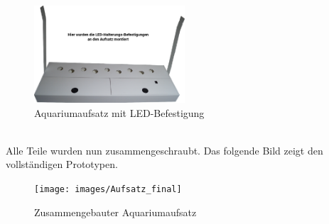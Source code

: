 \begin{description}
    \begin{figure}[ht]
        \centering
        \includegraphics[width=0.5\textwidth]{images/Aufsatz_komplett_LED}
	    \caption{Aquariumaufsatz mit LED-Befestigung}
    \end{figure}\mbox{} \\
    Alle Teile wurden nun zusammengeschraubt. Das folgende Bild zeigt den vollständigen Prototypen. \mbox{} \\
    \begin{figure}[ht]
        \centering
        \texttt{[image: images/Aufsatz\_final]}
	    \caption{Zusammengebauter Aquariumaufsatz}
    \end{figure}
\end{description}